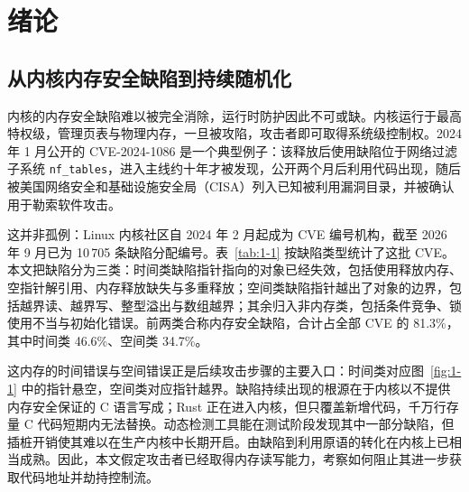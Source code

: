 \chapter{绪论}
\label{chap:1}

\section{从内核内存安全缺陷到持续随机化}

内核的内存安全缺陷难以被完全消除，运行时防护因此不可或缺。内核运行于最高特权级，管理页表与物理内存，一旦被攻陷，攻击者即可取得系统级控制权。2024 年 1 月公开的 CVE-2024-1086 是一个典型例子：该释放后使用缺陷位于网络过滤子系统 \lstinline[breaklines=false]@nf_tables@，进入主线约十年才被发现，公开两个月后利用代码出现，随后被美国网络安全和基础设施安全局（CISA）列入已知被利用漏洞目录，并被确认用于勒索软件攻击。

这并非孤例：Linux 内核社区自 2024 年 2 月起成为 CVE 编号机构，截至 2026 年 9 月已为 10\,705 条缺陷分配编号。表~\ref{tab:1-1} 按缺陷类型统计了这批 CVE。本文把缺陷分为三类：时间类缺陷指针指向的对象已经失效，包括使用释放内存、空指针解引用、内存释放缺失与多重释放；空间类缺陷指针越出了对象的边界，包括越界读、越界写、整型溢出与数组越界；其余归入非内存类，包括条件竞争、锁使用不当与初始化错误。前两类合称内存安全缺陷，合计占全部 CVE 的 81.3\%，其中时间类 46.6\%、空间类 34.7\%。

这内存的时间错误与空间错误正是后续攻击步骤的主要入口：时间类对应图~\ref{fig:1-1} 中的指针悬空，空间类对应指针越界。缺陷持续出现的根源在于内核以不提供内存安全保证的 C 语言写成；Rust 正在进入内核，但只覆盖新增代码\citep{peng2025asterinas}，千万行存量 C 代码短期内无法替换。动态检测工具能在测试阶段发现其中一部分缺陷，但插桩开销使其难以在生产内核中长期开启\citep{cho2023bokasan}。由缺陷到利用原语的转化在内核上已相当成熟\citep{wu2018fuze,chen2020koobe,zeng2022playing,lee2023pspray,liang2024kleak}。因此，本文假定攻击者已经取得内存读写能力，考察如何阻止其进一步获取代码地址并劫持控制流。

